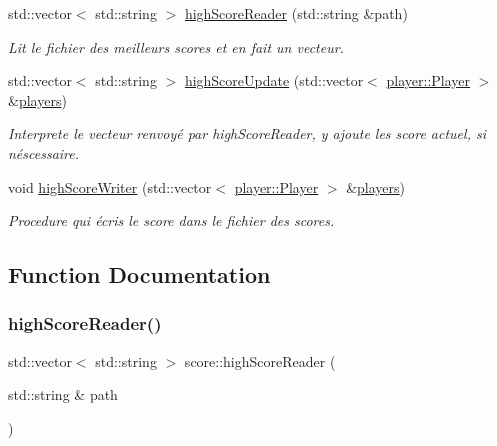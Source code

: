 \begin{DoxyCompactItemize}
std\+::vector$<$ std\+::string $>$ \hyperlink{namespacescore_a369bea39905535234b2a593129b0599b}{high\+Score\+Reader} (std\+::string \&path)
\begin{DoxyCompactList}\small\item\em Lit le fichier des meilleurs scores et en fait un vecteur. \end{DoxyCompactList}\item 
std\+::vector$<$ std\+::string $>$ \hyperlink{namespacescore_a80f57620018fa7797c3e4f1d34479277}{high\+Score\+Update} (std\+::vector$<$ \hyperlink{structplayer_1_1_player}{player\+::\+Player} $>$ \&\hyperlink{multi_8cpp_abd9de51dc9a6f90588878ff69cec449d}{players})
\begin{DoxyCompactList}\small\item\em Interprete le vecteur renvoyé par high\+Score\+Reader, y ajoute les score actuel, si néscessaire. \end{DoxyCompactList}\item 
void \hyperlink{namespacescore_a67da81a4506de38ca8e841ba9251fbb3}{high\+Score\+Writer} (std\+::vector$<$ \hyperlink{structplayer_1_1_player}{player\+::\+Player} $>$ \&\hyperlink{multi_8cpp_abd9de51dc9a6f90588878ff69cec449d}{players})
\begin{DoxyCompactList}\small\item\em Procedure qui écris le score dans le fichier des scores. \end{DoxyCompactList}\end{DoxyCompactItemize}


\subsection{Function Documentation}
\mbox{\label{namespacescore_a369bea39905535234b2a593129b0599b}} 
\subsubsection{\texorpdfstring{high\+Score\+Reader()}{highScoreReader()}}
{\footnotesize\ttfamily std\+::vector$<$ std\+::string $>$ score\+::high\+Score\+Reader (\begin{DoxyParamCaption}\item[{std\+::string \&}]{path }\end{DoxyParamCaption})}



